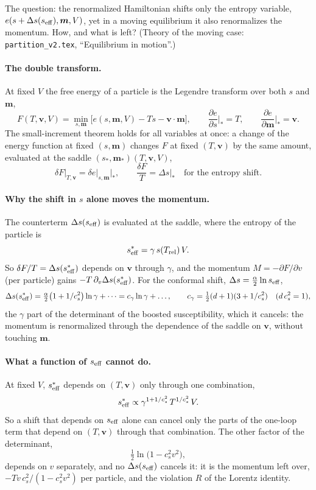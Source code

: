 \documentclass[11pt,aps,preprint,nofootinbib,superscriptaddress,tightenlines]{revtex4-2}
\def\st{\begin{equation}}
\def\stp{\end{equation}}
\let\oldparagraph\paragraph
\renewcommand{\paragraph}{\par\bigskip\oldparagraph}
\begin{document}
The question: the renormalized Hamiltonian shifts only the entropy variable, $e(s+\Delta s(s_{\rm eff}),\bm m,V)$, yet in a moving equilibrium it also renormalizes the
momentum.  How, and what is left?  (Theory of the moving case: \nolinkurl{partition_v2.tex}, ``Equilibrium in motion''.)

\paragraph{The double transform.}  At fixed $V$ the free energy of a particle is the Legendre transform over both $s$ and $\bm m$,
\st
F(T,\bm v,V)=\min_{s,\bm m}\big[e(s,\bm m,V)-Ts-\bm v\cdot\bm m\big],\qquad
\frac{\partial e}{\partial s}\Big|_*=T,\qquad \frac{\partial e}{\partial\bm m}\Big|_*=\bm v .
\stp
The small-increment theorem holds for all variables at once: a change of the energy function at fixed $(s,\bm m)$ changes $F$ at fixed $(T,\bm v)$ by the same amount,
evaluated at the saddle $(s_*,\bm m_*)(T,\bm v,V)$,
\st
\delta F\big|_{T,\bm v}=\delta e\big|_{s,\bm m}\Big|_*,\qquad \frac{\delta F}T=\Delta s\big|_*\quad\text{for the entropy shift} .
\stp

\paragraph{Why the shift in $s$ alone moves the momentum.}  The counterterm $\Delta s(s_{\rm eff})$ is evaluated at the saddle, where the entropy of the particle is
\st
s_{\rm eff}^*=\gamma\,s(T_{\rm rel})\,V .
\stp
So $\delta F/T=\Delta s(s_{\rm eff}^*)$ depends on $\bm v$ through $\gamma$, and the momentum $M=-\partial F/\partial v$ (per particle) gains $-T\,\partial_v\Delta s(s_{\rm eff}^*)$.  For the conformal
shift, $\Delta s=\tfrac\alpha2\ln s_{\rm eff}$,
\st
\Delta s(s_{\rm eff}^*)=\tfrac\alpha2\big(1+1/c_s^2\big)\ln\gamma+\dots=c_\gamma\ln\gamma+\dots,\qquad c_\gamma=\tfrac12(d+1)(3+1/c_s^2)\quad(d\,c_s^2=1) ,
\stp
the $\gamma$ part of the determinant of the boosted susceptibility, which it cancels: the momentum is renormalized through the dependence of the saddle on $\bm v$,
without touching $\bm m$.

\paragraph{What a function of $s_{\rm eff}$ cannot do.}  At fixed $V$, $s_{\rm eff}^*$ depends on $(T,\bm v)$ only through one combination,
\st
s_{\rm eff}^*\propto\gamma^{1+1/c_s^2}\,T^{1/c_s^2}\,V .
\stp
So a shift that depends on $s_{\rm eff}$ alone can cancel only the parts of the one-loop term that depend on $(T,\bm v)$ through that combination.  The other factor of the
determinant,
\st
\tfrac12\ln\big(1-c_s^2v^2\big) ,
\stp
depends on $v$ separately, and no $\Delta s(s_{\rm eff})$ cancels it: it is the momentum left over, $-T v\,c_s^2/(1-c_s^2v^2)$ per particle, and the violation $R$ of the Lorentz
identity.
\end{document}
